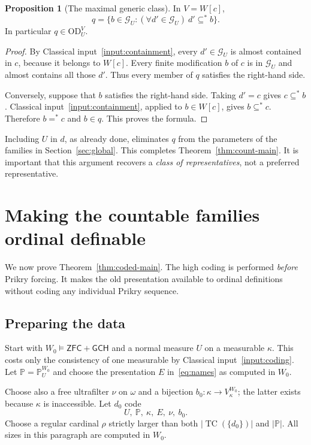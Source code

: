 \documentclass[11pt,letterpaper]{article}
\theoremstyle{definition}
\newtheorem{proposition}[definition]{Proposition}
\numberwithin{equation}{section}
\newcommand{\ZFC}{\mathsf{ZFC}}
\newcommand{\GCH}{\mathsf{GCH}}
\newcommand{\OD}{\mathrm{OD}}
\newcommand{\PP}{\mathbb P}
\newcommand{\TC}{\operatorname{TC}}
\begin{document}
\begin{proposition}[The maximal generic class]\label{prop:q-definable}
In $V=W[c]$,
\begin{equation}\label{eq:qdef}
q=\{b\in\mathcal G_U:
                (\forall d'\in\mathcal G_U)\ d'\subseteq^* b\}.
\end{equation}
In particular $q\in\OD_U^V$.
\end{proposition}
\begin{proof}
By Classical input~\ref{input:containment}, every $d'\in\mathcal G_U$ is almost contained in $c$, because it belongs to $W[c]$. Every finite modification $b$ of $c$ is in $\mathcal G_U$ and almost contains all those $d'$. Thus every member of $q$ satisfies the right-hand side.

Conversely, suppose that $b$ satisfies the right-hand side. Taking $d'=c$ gives $c\subseteq^*b$. Classical input~\ref{input:containment}, applied to $b\in W[c]$, gives $b\subseteq^*c$. Therefore $b=^*c$ and $b\in q$. This proves the formula.
\end{proof}

Including $U$ in $d$, as already done, eliminates $q$ from the parameters of the families in Section~\ref{sec:global}. This completes Theorem~\ref{thm:count-main}. It is important that this argument recovers a \emph{class of representatives}, not a preferred representative.

\section{Making the countable families ordinal definable}\label{sec:coding}

We now prove Theorem~\ref{thm:coded-main}. The high coding is performed \emph{before} Prikry forcing. It makes the old presentation available to ordinal definitions without coding any individual Prikry sequence.

\subsection{Preparing the data}

Start with $W_0\models\ZFC+\GCH$ and a normal measure $U$ on a measurable $\kappa$. This costs only the consistency of one measurable by Classical input~\ref{input:coding}. Let $\PP=\PP_U^{W_0}$ and choose the presentation $E$ in~\eqref{eq:names} as computed in $W_0$.

Choose also a free ultrafilter $\nu$ on $\omega$ and a bijection $b_0:\kappa\to V_\kappa^{W_0}$; the latter exists because $\kappa$ is inaccessible. Let $d_0$ code
\[
U,\ \PP,\ \kappa,\ E,\ \nu,\ b_0.
\]
Choose a regular cardinal $\rho$ strictly larger than both $|\TC(\{d_0\})|$ and $|\PP|$. All sizes in this paragraph are computed in $W_0$.
\end{document}
